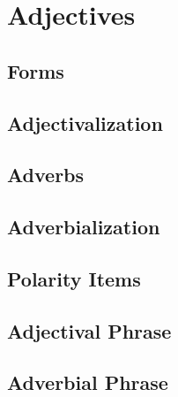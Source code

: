 \chapter{Adjectives}
	\section{Forms}
	\section{Adjectivalization}
	\section{Adverbs}
	\section{Adverbialization}
	\section{Polarity Items}
	\section{Adjectival Phrase}
	\section{Adverbial Phrase}
